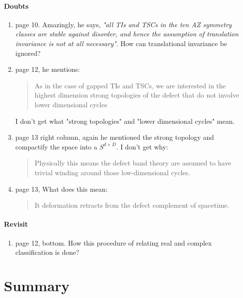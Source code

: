\documentclass{article}
\begin{document}
\paragraph{Doubts}
\begin{enumerate}
    \item page 10. Amazingly, he says, \textit{"all TIs and TSCs in
        the ten AZ symmetry classes are stable against disorder, and
        hence the assumption of translation invariance is not at all
        necessary"}.  How can translational invariance be ignored?
    \item page 12, he mentions:
        \begin{quote}
            As in the case of gapped TIs and TSCs, we are interested
            in the highest dimension strong topologies of the defect
            that do not involve lower dimensional cycles
        \end{quote}
        I don't get what "strong topologies" and "lower dimensional
        cycles" mean.
    \item page 13 right column, again he mentioned the strong topology
        and compactify the space into a $S^{d+D}$. I don't get why:
        \begin{quote}
            Physically this means the defect band theory are assumed
            to have trivial winding around those low-dimensional
            cycles.
        \end{quote}
        
    \item page 13, What does this mean:
        \begin{quote}
            It deformation retracts from the defect complement of
            spacetime.
        \end{quote}
        
\end{enumerate}

\paragraph{Revisit}
\begin{enumerate}
    \item page 12, bottom. How this procedure of relating real and
        complex classification is done?
\end{enumerate}
\section{Summary}
\label{sec:Summary}
\end{document}
